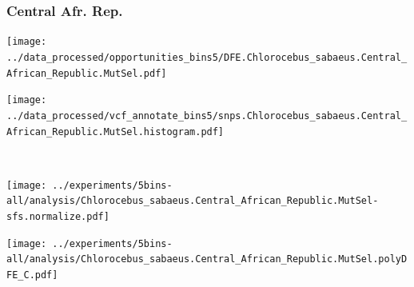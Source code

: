 \subsubsection{Central Afr. Rep.}

\begin{minipage}{0.49\linewidth}
    \texttt{[image: ../data\_processed/opportunities\_bins5/DFE.Chlorocebus\_sabaeus.Central\_African\_Republic.MutSel.pdf]}
\end{minipage}
\begin{minipage}{0.49\linewidth}
    \texttt{[image: ../data\_processed/vcf\_annotate\_bins5/snps.Chlorocebus\_sabaeus.Central\_African\_Republic.MutSel.histogram.pdf]}
\end{minipage}
\\
\begin{minipage}{0.49\linewidth}
    \texttt{[image: ../experiments/5bins-all/analysis/Chlorocebus\_sabaeus.Central\_African\_Republic.MutSel-sfs.normalize.pdf]}
\end{minipage}
\begin{minipage}{0.4\linewidth}
    \texttt{[image: ../experiments/5bins-all/analysis/Chlorocebus\_sabaeus.Central\_African\_Republic.MutSel.polyDFE\_C.pdf]}
\end{minipage}
